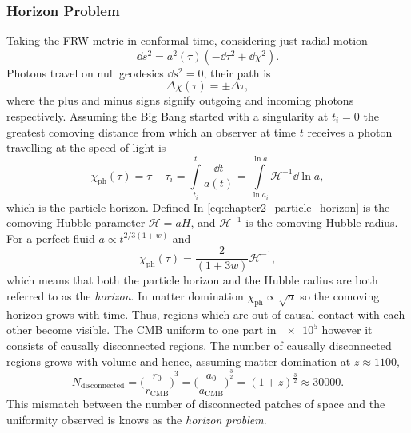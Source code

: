 \subsubsection{Horizon Problem}

Taking the FRW metric in conformal time, considering just radial motion
%
\begin{equation}
	\dd{s^{2}}
	= a^{2}(\tau)(-\dd{\tau^{2}} + \dd{\chi^{2}}).
\end{equation}
%
Photons travel on null geodesics \(\dd{s^{2}}=0\), their path is
%
\begin{equation}
	\Delta\chi(\tau)
	= \pm\Delta\tau,
\end{equation}
%
where the plus and minus signs signify outgoing and incoming photons respectively.
Assuming the Big Bang started with a singularity at \(t_{i}=0\) the greatest comoving distance from which an observer at time \(t\) receives a photon travelling at the speed of light is
%
\begin{equation}\label{eq:chapter2_particle_horizon}
	\chi_{\text{ph}}(\tau)
	= \tau - \tau_{i} = \int\limits_{t_{i}}^{t} \frac{\dd{t}}{a(t)}
	= \int\limits_{\ln{a_{i}}}^{\ln{a}} \mathcal{H}^{-1} \dd{\ln{a}},
\end{equation}
%
which is the particle horizon.
Defined In \cref{eq:chapter2_particle_horizon} is the comoving Hubble parameter \(\mathcal{H}=aH\), and \(\mathcal{H}^{-1}\) is the comoving Hubble radius.
For a perfect fluid \(a \propto t^{2/3(1+w)}\) and
%
\begin{equation}
	\chi_{\text{ph}}(\tau)
	= \frac{2}{(1+3w)} \mathcal{H}^{-1},
\end{equation}
%
which means that both the particle horizon and the Hubble radius are both referred to as the \emph{horizon}.
In matter domination \(\chi_{\text{ph}} \propto \sqrt{a}\) so the comoving horizon grows with time.
Thus, regions which are out of causal contact with each other become visible.
The CMB uniform to one part in \(\num{e5}\) however it consists of causally disconnected regions.
The number of causally disconnected regions grows with volume and hence, assuming matter domination at \(z \approx \num{1100}\),
%
\begin{equation}
	N_{\text{disconnected}}
		= {\bigg(\frac{r_{0}}{r_{\text{CMB}}}\bigg)}^{3}
		= {\bigg(\frac{a_{0}}{a_{\text{CMB}}}\bigg)}^{\frac{3}{2}}
		= {(1+z)}^{\frac{3}{2}}
	\approx \num{30000}.
\end{equation}
%
This mismatch between the number of disconnected patches of space and the uniformity observed is knows as the \emph{horizon problem}.

